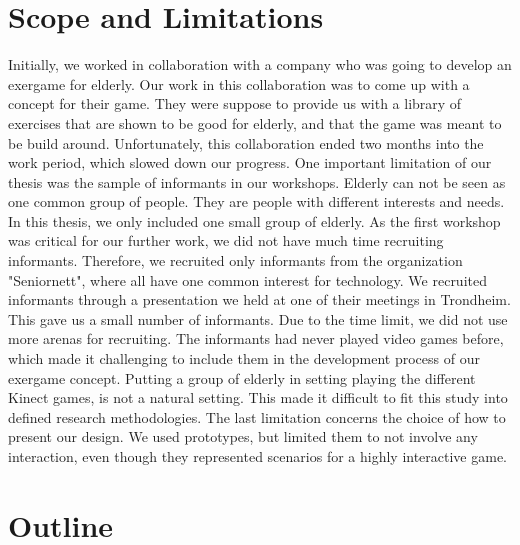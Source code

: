\section{Scope and Limitations}
Initially, we worked in collaboration with a company who was going to develop an exergame for elderly. Our work in this collaboration was to come up with a concept for their game. They were suppose to provide us with a library of exercises that are shown to be good for elderly, and that the game was meant to be build around. Unfortunately, this collaboration ended two months into the work period, which slowed down our progress.  One important limitation of our thesis was the sample of informants in our workshops. Elderly can not be seen as one common group of people. They are people with different interests and needs. In this thesis, we only included one small group of elderly. As the first workshop was critical for our further work, we did not have much time recruiting informants. Therefore, we recruited only informants from the organization "Seniornett", where all have one common interest for technology. We recruited informants through a presentation we held at one of their meetings in Trondheim. This gave us a small number of informants. Due to the time limit, we did not use more arenas for recruiting. The informants had never played video games before, which made it challenging to include them in the development process of our exergame concept. Putting a group of elderly in setting playing the different Kinect games, is not a natural setting. This made it difficult to fit this study into defined research methodologies. The last limitation concerns the choice of how to present our design. We used prototypes, but limited them to not involve any interaction, even though they represented scenarios for a highly interactive game.  


\section{Outline}